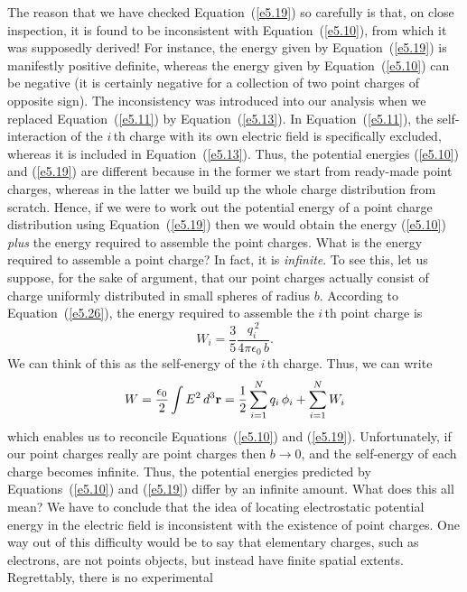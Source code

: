 The reason  that we have checked Equation~(\ref{e5.19}) so carefully is that, on close inspection,
it  is found to be 
inconsistent with Equation~(\ref{e5.10}), from which it was supposedly derived!
For instance, the energy given by Equation~(\ref{e5.19}) is manifestly positive definite, whereas
the energy given by Equation~(\ref{e5.10}) can be negative (it is certainly negative for
a collection of two point charges of opposite sign). The
inconsistency was introduced into our analysis when we replaced Equation~(\ref{e5.11}) by
Equation~(\ref{e5.13}). In Equation~(\ref{e5.11}), the  self-interaction of the $i$\,th charge with its
own electric field is specifically excluded, whereas it is included in Equation~(\ref{e5.13}). Thus,
the potential energies
(\ref{e5.10}) and (\ref{e5.19}) are different because in the former we start from 
ready-made point charges, whereas in the latter we build up the whole
charge distribution from scratch. Hence, if we were to work out the
potential energy of a point charge distribution using   Equation~(\ref{e5.19}) then 
we would obtain the energy (\ref{e5.10}) {\em plus} the energy required to assemble the
point charges. What is the energy required to assemble a point charge?
In fact, it is {\em infinite}. To see this, let us suppose, for the sake of argument, that
our point charges actually consist of charge uniformly distributed in small
spheres of radius $b$. According to Equation~(\ref{e5.26}), the energy required to assemble the
$i$\,th point charge is
\begin{equation}
W_i = \frac{3}{5} \frac{q_i^{\,2}}{4\pi\epsilon_0 \,b}.
\end{equation}
We can think of this as the self-energy of the $i$\,th charge. 
Thus, we can write
\begin{equation}
W = \frac{\epsilon_0}{2} \int E^2 \,d^3{\bf r} = \frac{1}{2} \sum_{i=1}^N
q_i \,\phi_i + \sum_{i=1}^N W_i
\end{equation}
which enables us to reconcile Equations~(\ref{e5.10}) and (\ref{e5.19}). Unfortunately, if
our point charges really are point charges then $b\rightarrow 0$, and the
self-energy of each charge becomes infinite. Thus, the potential 
energies predicted by Equations~(\ref{e5.10}) and (\ref{e5.19}) differ by an infinite amount. 
What does this all mean? We have to conclude that the idea of locating electrostatic
potential energy in the electric field is inconsistent with the existence of point charges. One way out of this difficulty would be to
say that  elementary charges, such as electrons, are not points objects, but instead have finite spatial extents. Regrettably, there is no experimental
